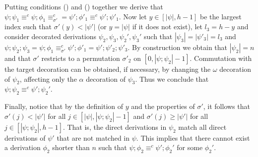 \documentclass[conference]{IEEEtran}
\renewenvironment{proof}{\begin{IEEEproof}}{\end{IEEEproof}}
\newcommand{\interval}[2][1]{\ensuremath{[{#1},{#2}]}}
\newcommand{\perm}{\sigma}
\begin{document}
\begin{proof}
\begin{enumerate}
  Putting conditions (\dag) and (\ddag) together we derive that
  $\psi;\psi_1 \equiv^c \psi;\phi_1\equiv^c_{\perm'} = \psi';\phi'_1
  \equiv^c \psi';\psi'_1$.  Now let $y \in\interval[|\psi|]{h-1}$ be
  the largest index such that $\perm'(y) < |\psi'|$ (or $y= |\psi|$ if
  it does not exist), let $l_3 = h - y$ and consider decorated
  derivations $\psi_2, \psi_3, \psi_2',\psi_3'$ such that
  $|\psi_3| = |\psi'_3| = l_3$ and
  $ \psi;\psi_2;\psi_3 = \psi;\phi_1 \equiv^c_{\perm'} \psi';\phi'_1 =
  \psi';\psi'_2;\psi'_3$.  By construction we obtain that
  $|\psi_2| = n$ and that $\perm'$ restricts to a permutation
  $\perm'_2$ on $\interval[0]{|\psi;\psi_2|-1}$. Commutation with the
  target decoration can be obtained, if necessary, by changing the
  $\omega$ decoration of $\psi_2$, affecting only the $\alpha$
  decoration of $\psi_3$. Thus
  we conclude that
  $\psi;\psi_2 \equiv^c \psi';\psi_2'$.
  
  Finally, notice that by the definition of $y$ and the properties of $\perm'$, 
  it follows that $\perm'(j) < |\psi'|$ for all $j \in
  \interval[|\psi|]{|\psi;\psi_2|-1}$ and $\perm'(j) \geq |\psi'|$ for all $j \in \interval[|\psi;\psi_2|]{h-1}$. 
  That is, the direct derivations in $\psi_2$ match 
  all direct derivations of $\psi'$ that are not matched in $\psi$. This implies that 
  there cannot exist a derivation $\phi_2$ shorter than $n$ such that 
  $\psi;\phi_2 \equiv^c \psi';\phi_2'$ for some $\phi_2'$.
  
  
  

\end{enumerate}
\end{proof}
\end{document}
